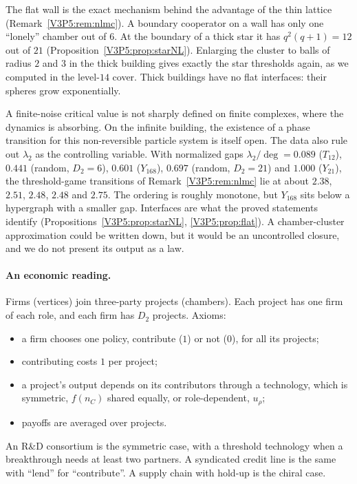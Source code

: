 The flat wall is the exact mechanism behind the advantage of the thin lattice
(Remark~\ref{V3P5:rem:nlmc}). A boundary cooperator on a wall has only one ``lonely'' chamber out of
$6$. At the boundary of a thick star it has $q^{2}(q+1)=12$ out of $21$
(Proposition~\ref{V3P5:prop:starNL}). Enlarging the cluster to balls of radius $2$ and $3$ in the
thick building gives exactly the star thresholds again, as we computed in the level-$14$ cover. Thick
buildings have no flat interfaces: their spheres grow exponentially.

\begin{remark}\label{V3P5:rem:nolaw}
A finite-noise critical value is not sharply defined on finite complexes, where the dynamics is
absorbing. On the infinite building, the existence of a phase transition for this non-reversible
particle system is itself open. The data also rule out $\lambda_2$ as the controlling variable.
With normalized gaps $\lambda_2/\deg=0.089$ ($T_{12}$), $0.441$ (random, $D_2=6$), $0.601$
($Y_{168}$), $0.697$ (random, $D_2=21$) and $1.000$ ($Y_{21}$), the threshold-game transitions of
Remark~\ref{V3P5:rem:nlmc} lie at about $2.38$, $2.51$, $2.48$, $2.48$ and $2.75$. The ordering is
roughly monotone, but $Y_{168}$ sits below a hypergraph with a smaller gap. Interfaces are what the
proved statements identify (Propositions~\ref{V3P5:prop:starNL}, \ref{V3P5:prop:flat}). A
chamber-cluster approximation could be written down, but it would be an uncontrolled closure,
and we do not present its output as a law.
\end{remark}

\paragraph{An economic reading.} Firms (vertices) join three-party projects (chambers). Each
project has one firm of each role, and each firm has $D_2$ projects. Axioms:
\begin{itemize}
\item[(A1)] a firm chooses one policy, contribute ($1$) or not ($0$), for all its projects;
\item[(A2)] contributing costs $1$ per project;
\item[(A3)] a project's output depends on its contributors through a technology, which is
symmetric, $f(n_C)$ shared equally, or role-dependent, $u_\rho$;
\item[(A4)] payoffs are averaged over projects.
\end{itemize}
An R\&D consortium is the symmetric case, with a threshold technology when a breakthrough needs at
least two partners. A syndicated credit line is the same with ``lend'' for ``contribute''. A supply
chain with hold-up is the chiral case.

